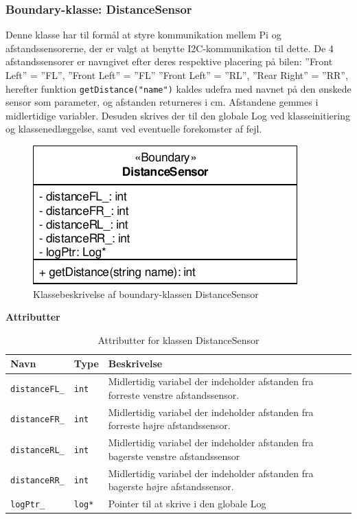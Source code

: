\subsubsection{Boundary-klasse: DistanceSensor} \label{sec:sw_design_distancesensor}

Denne klasse har til formål at styre kommunikation mellem Pi og afstandssensorerne, der er valgt at benytte I2C-kommunikation til dette. De 4 afstandssensorer er navngivet efter deres respektive placering på bilen: ''Front Left'' = ''FL'', ''Front Left'' = ''FL'' ''Front Left'' = ''RL'', ''Rear Right'' = ''RR'', herefter funktion  \texttt{getDistance("name")} kaldes udefra med navnet på den ønskede sensor som parameter, og afstanden returneres i cm. Afstandene gemmes i midlertidige variabler. Desuden skrives der til den globale Log ved klasseinitiering og klassenedlæggelse, samt ved eventuelle forekomster af fejl.

\begin{figure}[h]
\centering
\includegraphics[]{../fig/diagrammer/bil/cd_distancesensor.pdf}
\caption{Klassebeskrivelse af boundary-klassen DistanceSensor}
\label{fig:cd_distancesensor}
\end{figure}

\textbf{Attributter}

\begin{table}[h]
	\begin{tabularx}{\textwidth}{| Z | Z | L{10cm} |} \hline
		Navn & Type & Beskrivelse \\\hline
		\texttt{distanceFL\_} & \texttt{int} 		& Midlertidig variabel der indeholder afstanden fra forreste venstre afstandssensor.\\\hline
		\texttt{distanceFR\_} & \texttt{int} 		& Midlertidig variabel der indeholder afstanden fra forreste højre afstandssensor.	\\\hline
		\texttt{distanceRL\_} & \texttt{int} 		& Midlertidig variabel der indeholder afstanden fra bagerste venstre afstandssensor \\\hline
		\texttt{distanceRR\_} & \texttt{int} 		& Midlertidig variabel der indeholder afstanden fra bagerste højre afstandssensor.	\\\hline
		\texttt{logPtr\_} 	 & \texttt{log*} 		& Pointer til at skrive i den globale Log											\\\hline
	\end{tabularx}
	\caption{Attributter for klassen DistanceSensor}
	\label{table:attr_distancesensor}
\end{table}
\clearpage

